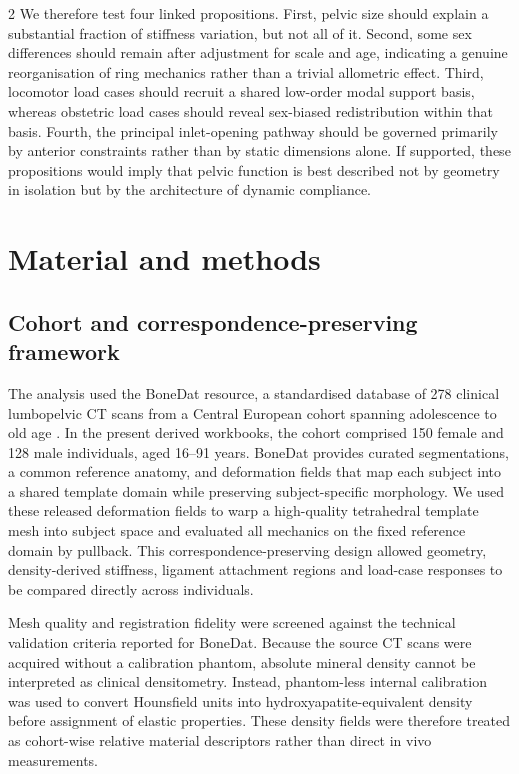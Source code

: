 \documentclass[openacc]{rsproca_new}
\begin{document}
\begin{multicols}{2}
We therefore test four linked propositions. First, pelvic size should explain a substantial fraction of stiffness variation, but not all of it. Second, some sex differences should remain after adjustment for scale and age, indicating a genuine reorganisation of ring mechanics rather than a trivial allometric effect. Third, locomotor load cases should recruit a shared low-order modal support basis, whereas obstetric load cases should reveal sex-biased redistribution within that basis. Fourth, the principal inlet-opening pathway should be governed primarily by anterior constraints rather than by static dimensions alone. If supported, these propositions would imply that pelvic function is best described not by geometry in isolation but by the architecture of dynamic compliance.

\section{Material and methods}

\subsection{Cohort and correspondence-preserving framework}

The analysis used the BoneDat resource, a standardised database of 278 clinical lumbopelvic CT scans from a Central European cohort spanning adolescence to old age \cite{HenysKuchar2025}. In the present derived workbooks, the cohort comprised 150 female and 128 male individuals, aged 16--91 years. BoneDat provides curated segmentations, a common reference anatomy, and deformation fields that map each subject into a shared template domain while preserving subject-specific morphology. We used these released deformation fields to warp a high-quality tetrahedral template mesh into subject space and evaluated all mechanics on the fixed reference domain by pullback. This correspondence-preserving design allowed geometry, density-derived stiffness, ligament attachment regions and load-case responses to be compared directly across individuals.

Mesh quality and registration fidelity were screened against the technical validation criteria reported for BoneDat. Because the source CT scans were acquired without a calibration phantom, absolute mineral density cannot be interpreted as clinical densitometry. Instead, phantom-less internal calibration was used to convert Hounsfield units into hydroxyapatite-equivalent density before assignment of elastic properties. These density fields were therefore treated as cohort-wise relative material descriptors rather than direct in vivo measurements.


\end{multicols}
\end{document}
